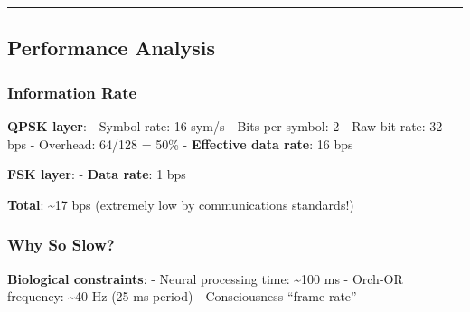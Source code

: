 \begin{center}\rule{0.5\linewidth}{0.5pt}\end{center}

\subsection{Performance Analysis}\label{performance-analysis}

\subsubsection{Information Rate}\label{information-rate}

\textbf{QPSK layer}: - Symbol rate: 16 sym/s - Bits per symbol: 2 - Raw
bit rate: 32 bps - Overhead: 64/128 = 50\% - \textbf{Effective data
rate}: 16 bps

\textbf{FSK layer}: - \textbf{Data rate}: 1 bps

\textbf{Total}: \textasciitilde17 bps (extremely low by communications
standards!)

\subsubsection{Why So Slow?}\label{why-so-slow}

\textbf{Biological constraints}: - Neural processing time:
\textasciitilde100 ms - Orch-OR frequency: \textasciitilde40 Hz (25 ms
period) - Consciousness ``frame rate''
